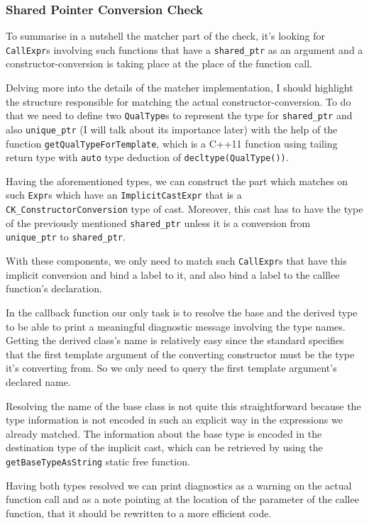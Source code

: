 \subsubsection{Shared Pointer Conversion Check}
\par To summarise in a nutshell the matcher part of the check, it's looking for \verb|CallExpr|s involving such functions that have a \verb|shared_ptr| as an argument and a constructor-conversion is taking place at the place of the function call. \medskip
\par Delving more into the details of the matcher implementation, I should highlight the structure responsible for matching the actual constructor-conversion. To do that we need to define two \verb|QualType|s to represent the type for \verb|shared_ptr| and also \verb|unique_ptr| (I will talk about its importance later) with the help of the function \verb|getQualTypeForTemplate|, which is a C++11 function using tailing return type with \verb|auto| type deduction of \verb|decltype(QualType())|. \medskip
\par Having the aforementioned types, we can construct the part which matches on such \verb|Expr|s which have an \verb|ImplicitCastExpr| that is a \verb|CK_ConstructorConversion| type of cast. Moreover, this cast has to have the type of the previously mentioned \verb|shared_ptr| unless it is a conversion from \verb|unique_ptr| to \verb|shared_ptr|. \medskip
\par With these components, we only need to match such \verb|CallExpr|s that have this implicit conversion and bind a label to it, and also bind a label to the calllee function's declaration. \medskip
\par In the callback function our only task is to resolve the base and the derived type to be able to print a meaningful diagnostic message involving the type names. Getting the derived class's name is relatively easy since the standard specifies\cite[\S20.8.2.2.1]{cpp_standard} that the first template argument of the converting constructor must be the type it's converting from. So we only need to query the first template argument's declared name. \medskip
\par Resolving the name of the base class is not quite this straightforward because the type information is not encoded in such an explicit way in the expressions we already matched. The information about the base type is encoded in the destination type of the implicit cast, which can be retrieved by using the \verb|getBaseTypeAsString| static free function. \medskip
\par Having both types resolved we can print diagnostics as a warning on the actual function call and as a note pointing at the location of the parameter of the callee function, that it should be rewritten to a more efficient code.
